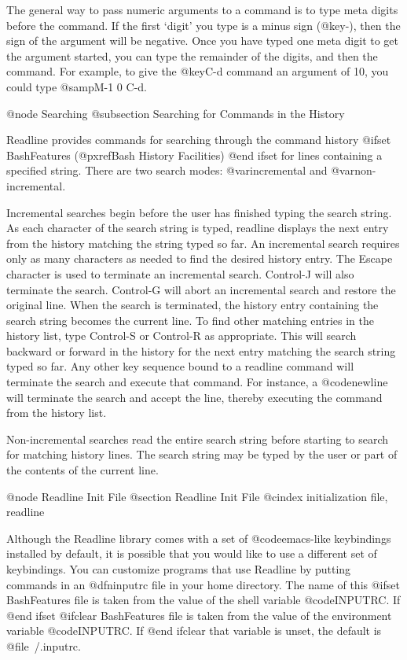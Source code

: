 The general way to pass numeric arguments to a command is to type meta
digits before the command.  If the first `digit' you type is a minus
sign (@key{-}), then the sign of the argument will be negative.  Once
you have typed one meta digit to get the argument started, you can type
the remainder of the digits, and then the command.  For example, to give
the @key{C-d} command an argument of 10, you could type @samp{M-1 0 C-d}.

@node Searching
@subsection Searching for Commands in the History

Readline provides commands for searching through the command history
@ifset BashFeatures
(@pxref{Bash History Facilities})
@end ifset
for lines containing a specified string.
There are two search modes:  @var{incremental} and @var{non-incremental}.

Incremental searches begin before the user has finished typing the
search string.
As each character of the search string is typed, readline displays
the next entry from the history matching the string typed so far.
An incremental search requires only as many characters as needed to
find the desired history entry.
The Escape character is used to terminate an incremental search.
Control-J will also terminate the search.
Control-G will abort an incremental search and restore the original
line.
When the search is terminated, the history entry containing the
search string becomes the current line.
To find other matching entries in the history list, type Control-S or
Control-R as appropriate.
This will search backward or forward in the history for the next
entry matching the search string typed so far.
Any other key sequence bound to a readline command will terminate
the search and execute that command.
For instance, a @code{newline} will terminate the search and accept
the line, thereby executing the command from the history list.

Non-incremental searches read the entire search string before starting
to search for matching history lines.  The search string may be
typed by the user or part of the contents of the current line.

@node Readline Init File
@section Readline Init File
@cindex initialization file, readline

Although the Readline library comes with a set of @code{emacs}-like
keybindings installed by default,
it is possible that you would like to use a different set
of keybindings.  You can customize programs that use Readline by putting
commands in an @dfn{inputrc} file in your home directory.  The name of this
@ifset BashFeatures
file is taken from the value of the shell variable @code{INPUTRC}.  If
@end ifset
@ifclear BashFeatures
file is taken from the value of the environment variable @code{INPUTRC}.  If
@end ifclear
that variable is unset, the default is @file{~/.inputrc}.


